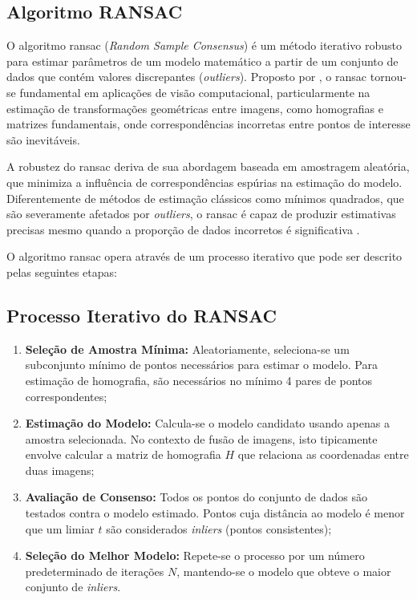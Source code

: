 \subsection{Algoritmo RANSAC}\label{subsec:ransac}

O algoritmo \gls{ransac} (\textit{Random Sample Consensus}) é um método iterativo robusto para estimar parâmetros de um modelo matemático a partir de um conjunto de dados que contém valores discrepantes (\textit{outliers}). Proposto por , o \gls{ransac} tornou-se fundamental em aplicações de visão computacional, particularmente na estimação de transformações geométricas entre imagens, como homografias e matrizes fundamentais, onde correspondências incorretas entre pontos de interesse são inevitáveis.

A robustez do \gls{ransac} deriva de sua abordagem baseada em amostragem aleatória, que minimiza a influência de correspondências espúrias na estimação do modelo. Diferentemente de métodos de estimação clássicos como mínimos quadrados, que são severamente afetados por \textit{outliers}, o \gls{ransac} é capaz de produzir estimativas precisas mesmo quando a proporção de dados incorretos é significativa \cite{Hartley2003}.

O algoritmo \gls{ransac} opera através de um processo iterativo que pode ser descrito pelas seguintes etapas:

\subsection*{Processo Iterativo do RANSAC}

\begin{enumerate}
    \item \textbf{Seleção de Amostra Mínima:} Aleatoriamente, seleciona-se um subconjunto mínimo de pontos necessários para estimar o modelo. Para estimação de homografia, são necessários no mínimo 4 pares de pontos correspondentes;
    
    \item \textbf{Estimação do Modelo:} Calcula-se o modelo candidato usando apenas a amostra selecionada. No contexto de fusão de imagens, isto tipicamente envolve calcular a matriz de homografia $H$ que relaciona as coordenadas entre duas imagens;
    
    \item \textbf{Avaliação de Consenso:} Todos os pontos do conjunto de dados são testados contra o modelo estimado. Pontos cuja distância ao modelo é menor que um limiar $t$ são considerados \textit{inliers} (pontos consistentes);
    
    \item \textbf{Seleção do Melhor Modelo:} Repete-se o processo por um número predeterminado de iterações $N$, mantendo-se o modelo que obteve o maior conjunto de \textit{inliers}.
\end{enumerate}

